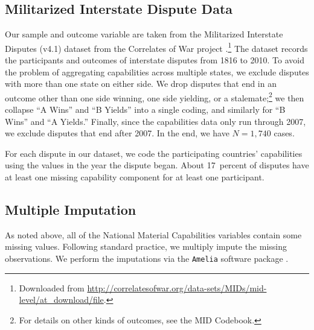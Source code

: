 \subsection{Militarized Interstate Dispute Data}

Our sample and outcome variable are taken from the Militarized Interstate Disputes (v4.1) dataset from the Correlates of War project .\footnote{
  Downloaded from \url{http://correlatesofwar.org/data-sets/MIDs/mid-level/at_download/file}.
}
The dataset records the participants and outcomes of interstate disputes from 1816 to 2010.
To avoid the problem of aggregating capabilities across multiple states, we exclude disputes with more than one state on either side.
We drop disputes that end in an outcome other than one side winning, one side yielding, or a stalemate;\footnote{
  For details on other kinds of outcomes, see the MID Codebook.
}
we then collapse ``A Wins'' and ``B Yields'' into a single coding, and similarly for ``B Wins'' and ``A Yields.''
Finally, since the capabilities data only run through 2007, we exclude disputes that end after 2007.
In the end, we have $N = 1{,}740$ cases.

For each dispute in our dataset, we code the participating countries' capabilities using the values in the year the dispute began.
About 17~percent of disputes have at least one missing capability component for at least one participant.

\subsection{Multiple Imputation}

As noted above, all of the National Material Capabilities variables contain some missing values.
Following standard practice, we multiply impute the missing observations.
We perform the imputations via the \texttt{Amelia} software package .

